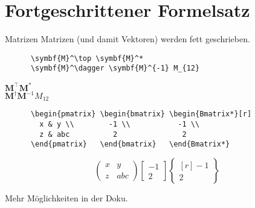 \section{Fortgeschrittener Formelsatz}

\begin{frame}[fragile]{
  Matrizen
  \hfill{}
}
  Matrizen (und damit Vektoren) werden fett geschrieben.
  \begin{CodeExample}{0.70}
    \begin{lstlisting}
      \symbf{M}^\top \symbf{M}^*
      \symbf{M}^\dagger \symbf{M}^{-1} M_{12}
    \end{lstlisting}
  \CodeResult
    $\symbf{M}^\top \symbf{M}^*$ \\
    $\symbf{M}^\dagger \symbf{M}^{-1} M_{12}$
  \end{CodeExample}

  \fontsize{8}{6}
  \begin{CodeExample}{0.70}
    \begin{lstlisting}
      \begin{pmatrix} \begin{bmatrix} \begin{Bmatrix*}[r]
        x & y \\        -1 \\           -1 \\
        z & abc          2               2
      \end{pmatrix}   \end{bmatrix}   \end{Bmatrix*}
    \end{lstlisting}
  \CodeResult
    \begin{equation*}
      \begin{pmatrix}
        x & y \\
        z & abc
      \end{pmatrix}
      \begin{bmatrix}
        -1 \\
         2
      \end{bmatrix}
      \begin{Bmatrix*}[r]
        -1 \\
         2
      \end{Bmatrix*}
    \end{equation*}
  \end{CodeExample}

  \vspace{1em}
  Mehr Möglichkeiten in der Doku.
\end{frame}

